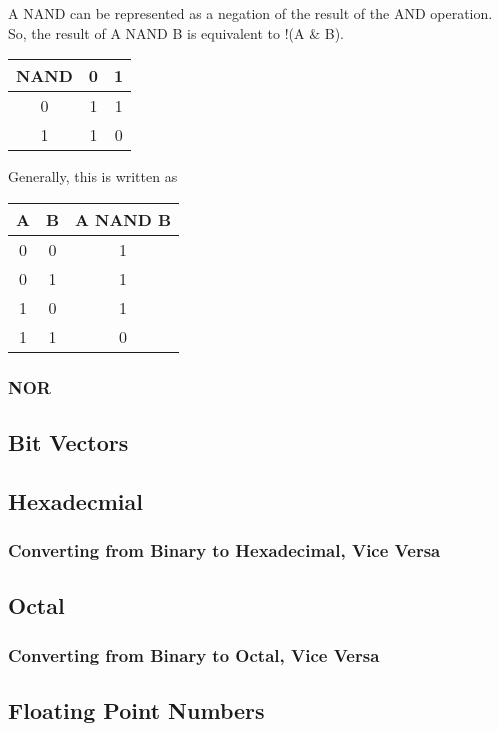 \documentclass[12pt]{article}
\begin{document}
A NAND can be represented as a negation of the result of the AND operation.
So, the result of A NAND B is equivalent to !(A \& B).
\begin{center}
    \begin{tabular}{|c|c|c|}
      \hline
      NAND & 0 & 1 \\
      \hline
      0 & 1 & 1 \\
      \hline
      1 & 1 & 0 \\
      \hline
    \end{tabular}
    \end{center}

    Generally, this is written as

    \begin{center}
        \begin{tabular}{|c|c|c|}
          \hline
          A & B & A NAND B \\
          \hline
          0 & 0 & 1 \\
          \hline
          0 & 1 & 1 \\
          \hline
          1 & 0 & 1 \\
          \hline
          1 & 1 & 0 \\
          \hline
        \end{tabular}
    \end{center}
    
\subsubsection{NOR}


\subsection{Bit Vectors}


\subsection{Hexadecmial}

\subsubsection{Converting from Binary to Hexadecimal, Vice Versa}

\subsection{Octal}

\subsubsection{Converting from Binary to Octal, Vice Versa}

\subsection{Floating Point Numbers}
\end{document}
